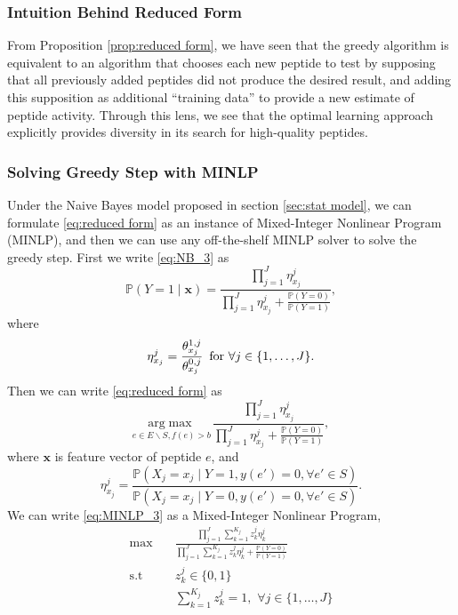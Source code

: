 \documentclass[11pt]{article}
\newcommand{\Prob}{\mathbb{P}}
\begin{document}
\subsubsection{Intuition Behind Reduced Form}
From Proposition \ref{prop:reduced form}, we have seen that the greedy algorithm
is equivalent to an algorithm that chooses each new peptide to test by supposing
that all previously added peptides did not produce the desired result, and adding
this supposition as additional \enquote{training data} to provide a new estimate
of peptide activity. Through this lens, we see that the optimal learning approach
explicitly provides diversity in its search for high-quality peptides.

\subsubsection{Solving Greedy Step with MINLP}
Under the Naive Bayes model proposed in section \ref{sec:stat model}, 
we can formulate \eqref{eq:reduced form} as an instance of Mixed-Integer 
Nonlinear Program (MINLP), and then we can use any off-the-shelf MINLP 
solver to solve the greedy step. First we write \eqref{eq:NB_3} as
\begin{equation}
  \Prob (Y = 1 \mid \bm{x}) = \frac{\prod_{j=1}^J \eta^j_{x_j}}
  {\prod_{j=1}^J \eta^j_{x_j} + \frac{\Prob(Y = 0)}{\Prob(Y = 1)}},
  \label{eq:MINLP_2}
\end{equation}
where
\begin{equation*}
  \eta^j_{x_j} = \frac{\theta^{1,j}_{x_j}}{\theta^{0,j}_{x_j}}
  \text{\,\,\,for $\forall j \in \{1,\ldots,J\}$}. 
\end{equation*}
Then we can write \eqref{eq:reduced form} as
\begin{equation}
  \underset{e \in E \backslash S, f(e) > b}{\mathrm{arg}\max} \, \frac{\prod_{j = 1}^J \eta^j_{x_j}}{\prod_{j = 1}^J \eta^j_{x_j} + \frac{\Prob(Y = 0)}{\Prob(Y = 1)}},
  \label{eq:MINLP_3}
\end{equation}
where $\bm{x}$ is feature vector of peptide $e$, and
\begin{equation*}
  \eta^j_{x_j} = \frac{\Prob(X_j = x_j \mid Y = 1, y(e') = 0, \forall e' \in S)}
  {\Prob(X_j = x_j \mid Y = 0, y(e') = 0, \forall e' \in S)}.
\end{equation*}
We can write \eqref{eq:MINLP_3} as a Mixed-Integer Nonlinear Program,
\begin{equation}
  \begin{split}
    \max \quad &\frac{\prod_{j=1}^J \sum_{k=1}^{K_j} z^j_k \eta^j_k}
    {\prod_{j=1}^J \sum_{k=1}^{K_j} z^j_k \eta^j_k + \frac{\Prob(Y = 0)}{\Prob(Y = 1)}} \\
    \text{s.t} \quad &z^j_k \in \{0,1\}\\
    &\sum_{k=1}^{K_j} z^j_k = 1, \,\, \forall j \in \{1, \ldots, J\}
  \end{split}
  \label{eq:MINLP_4}
\end{equation}
\end{document}
